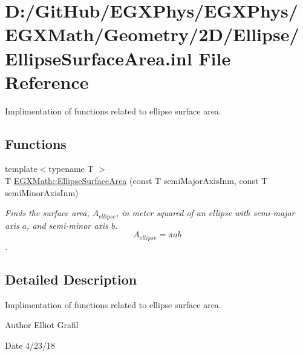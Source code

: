 \hypertarget{_ellipse_surface_area_8inl}{}\section{D\+:/\+Git\+Hub/\+E\+G\+X\+Phys/\+E\+G\+X\+Phys/\+E\+G\+X\+Math/\+Geometry/2\+D/\+Ellipse/\+Ellipse\+Surface\+Area.inl File Reference}
\label{_ellipse_surface_area_8inl}


Implimentation of functions related to ellipse surface area.  


\subsection*{Functions}
\begin{DoxyCompactItemize}
\item 
{\footnotesize template$<$typename T $>$ }\\T \mbox{\hyperlink{group___e_g_x_math-_geometry-2_d-_ellipse-_surface_area_ga4ce8c8323e9718ce5458f4ab7f6d823d}{E\+G\+X\+Math\+::\+Ellipse\+Surface\+Area}} (const T semi\+Major\+Axis\+Inm, const T semi\+Minor\+Axis\+Inm)
\begin{DoxyCompactList}\small\item\em Finds the surface area, $A_{ellipse}$, in meter squared of an ellipse with semi-\/major axis $a$, and semi-\/minor axis $b$. \[ A_{ellipse}=\pi a b \]. \end{DoxyCompactList}\end{DoxyCompactItemize}


\subsection{Detailed Description}
Implimentation of functions related to ellipse surface area. 

\begin{DoxyAuthor}{Author}
Elliot Grafil 
\end{DoxyAuthor}
\begin{DoxyDate}{Date}
4/23/18 
\end{DoxyDate}
